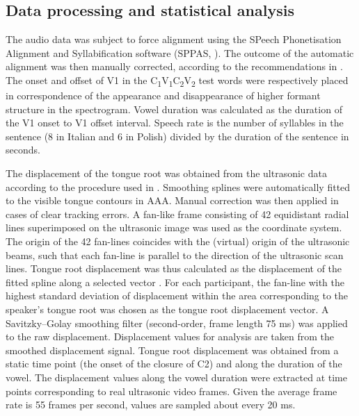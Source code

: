 \documentclass[12pt,]{article}
\begin{document}
\subsection{Data processing and statistical
analysis}\label{data-processing-and-statistical-analysis}

\label{s:process}

The audio data was subject to force alignment using the SPeech
Phonetisation Alignment and Syllabification software (SPPAS,
\citealt{bigi2015}). The outcome of the automatic alignment was then
manually corrected, according to the recommendations in
\citet{machac2009}. The onset and offset of V1 in the
C\textsubscript{1}V\textsubscript{1}C\textsubscript{2}V\textsubscript{2}
test words were respectively placed in correspondence of the appearance
and disappearance of higher formant structure in the spectrogram. Vowel
duration was calculated as the duration of the V1 onset to V1 offset
interval. Speech rate is the number of syllables in the sentence (8 in
Italian and 6 in Polish) divided by the duration of the sentence in
seconds.

The displacement of the tongue root was obtained from the ultrasonic
data according to the procedure used in \citet{kirkham2017}. Smoothing
splines were automatically fitted to the visible tongue contours in AAA.
Manual correction was then applied in cases of clear tracking errors. A
fan-like frame consisting of 42 equidistant radial lines superimposed on
the ultrasonic image was used as the coordinate system. The origin of
the 42 fan-lines coincides with the (virtual) origin of the ultrasonic
beams, such that each fan-line is parallel to the direction of the
ultrasonic scan lines. Tongue root displacement was thus calculated as
the displacement of the fitted spline along a selected vector
\citep{strycharczuk2015}. For each participant, the fan-line with the
highest standard deviation of displacement within the area corresponding
to the speaker's tongue root was chosen as the tongue root displacement
vector. A Savitzky--Golay smoothing filter (second-order, frame length
75 ms) was applied to the raw displacement. Displacement values for
analysis are taken from the smoothed displacement signal. Tongue root
displacement was obtained from a static time point (the onset of the
closure of C2) and along the duration of the vowel. The displacement
values along the vowel duration were extracted at time points
corresponding to real ultrasonic video frames. Given the average frame
rate is 55 frames per second, values are sampled about every 20 ms.
\end{document}
